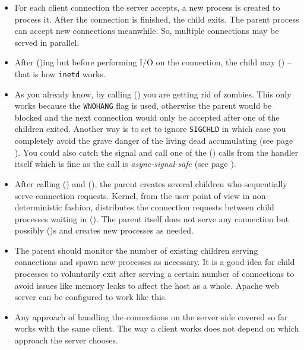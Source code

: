 
\begin{slide}

\end{slide}

\begin{itemize}
\item For each client connection the server accepts, a new process is created to
process it.  After the connection is finished, the child exits.  The parent
process can accept new connections meanwhile.  So, multiple connections may be
served in parallel.
\item After ()ing but before performing I/O on the connection, the
child may () -- that is how \texttt{inetd} works.
\item As you already know, by calling () you are getting rid of
zombies. This only works because the \texttt{WNOHANG} flag is used,
otherwise the parent would be blocked and the next connection would only be
accepted after one of the children exited.
Another way is to set to ignore \texttt{SIGCHLD} in which case you
completely avoid the grave danger of the living dead accumulating (see page
\pageref{IGNORE_SIG_CHLD}).  You could also catch the signal and call
one of the () calls from the handler itself which is fine as the
call is \emph{async-signal-safe} (see page \pageref{ASYNCSIGNALSAFE}).
\end{itemize}


\begin{slide}

\end{slide}

\begin{itemize}
\item After calling () and (), the parent creates
several children who sequentially serve connection requests.  Kernel,
from the user point of view in non-deterministic fashion, distributes the
connection requests between child processes waiting in ().
The parent itself does not serve any connection but possibly ()s and
creates new processes as needed.
\item The parent should monitor the number of existing children serving
connections and spawn new processes as necessary.
It is a good idea for child processes to voluntarily exit after serving a
certain number of connections to avoid issues like memory leaks to affect the
host as a whole. Apache web server can be configured to work like this.
\item Any approach of handling the connections on the server side covered so far
works with the same client. The way a client works does not depend on which
approach the server chooses.
\end{itemize}

